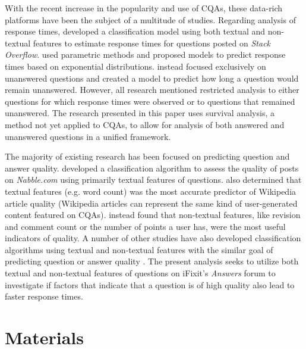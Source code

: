 \documentclass[]{interact}\usepackage[]{graphicx}\usepackage[]{color}
\begin{document}
{With the recent increase in the popularity and use of CQAs, these data-rich platforms have been the subject of a multitude of studies. Regarding analysis of response times, \citet{Bhat2014} developed a classification model using both textual and non-textual features to estimate response times for questions posted on \textit{Stack Overflow}. \citet{Mahmud2013} used parametric methods and proposed models to predict response times based on exponential distributions. \citet{Asaduzzaman2013} instead focused exclusively on unanswered questions and created a model to predict how long a question would remain unanswered. However, all research mentioned restricted analysis to either questions for which response times were observed or to questions that remained unanswered. The research presented in this paper uses survival analysis, a method not yet applied to CQAs, to allow for analysis of both answered and unanswered questions in a unified framework. 

The majority of existing research has been focused on predicting question and answer quality. \citet{Weimer2007} developed a classification algorithm to assess the quality of posts on \textit{Nabble.com} using primarily textual features of questions. \citet{Blumenstock2008} also determined that textual features (e.g. word count) was the most accurate predictor of Wikipedia article quality (Wikipedia articles can represent the same kind of user-generated content featured on CQAs). \citet{Fu2015} instead found that non-textual features, like revision and comment count or the number of points a user has, were the most useful indicators of quality. A number of other studies have also developed classification algorithms using textual and non-textual features with the similar goal of predicting question or answer quality \citep{Yao2015, Toba2014, Ponzanelli2014a, Ravi2014}. The present analysis seeks to utilize both textual and non-textual features of questions on iFixit's \textit{Answers} forum to investigate if factors that indicate that a question is of high quality also lead to faster response times.


\section{Materials}

}
\end{document}
